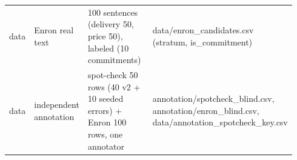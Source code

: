 \begin{table}[t]
\begin{tabular}{p{0.07\linewidth}p{0.16\linewidth}p{0.47\linewidth}p{0.24\linewidth}}
data & Enron real text & 100 sentences (delivery 50, price 50), labeled (10 commitments) & data/enron\_candidates.csv (stratum, is\_commitment) \\
data & independent annotation & spot-check 50 rows (40 v2 + 10 seeded errors) + Enron 100 rows, one annotator & annotation/spotcheck\_blind.csv, annotation/enron\_blind.csv, data/annotation\_spotcheck\_key.csv \\
\bottomrule
\end{tabular}
\end{table}
